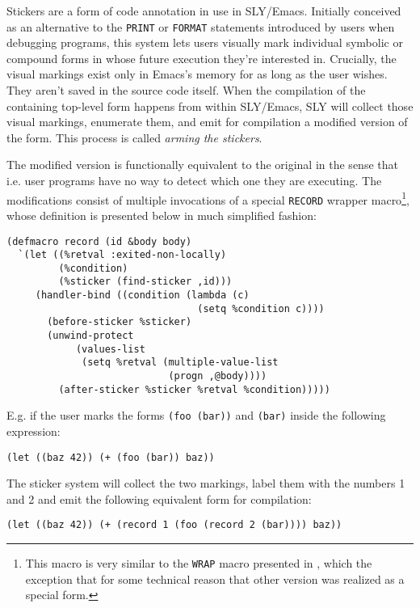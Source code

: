 \documentclass[sigconf]{acmart}
\begin{document}
Stickers are a form of code annotation in use in SLY/Emacs.  Initially
conceived as an alternative to the \texttt{PRINT} or \texttt{FORMAT}
statements introduced by users when debugging programs, this system
lets users visually mark individual symbolic or compound forms in
whose future execution they're interested in.  Crucially, the visual
markings exist only in Emacs's memory for as long as the user
wishes. They aren't saved in the source code itself.  When the
compilation of the containing top-level form happens from within
SLY/Emacs, SLY will collect those visual markings, enumerate them, and
emit for compilation a modified version of the form.  This process is
called \emph{arming the stickers}.

The modified version is functionally equivalent to the original in the
sense that i.e. user programs have no way to detect which one they are
executing.  The modifications consist of multiple invocations of a
special \texttt{RECORD} wrapper macro\footnote{This macro is very
  similar to the \texttt{WRAP} macro presented in
  \cite{annotation-based}, which the exception that for some technical
  reason that other version was realized as a special form.}, whose
definition is presented below in much simplified fashion:

\begin{verbatim}
(defmacro record (id &body body)
  `(let ((%retval :exited-non-locally)
         (%condition)
         (%sticker (find-sticker ,id)))
     (handler-bind ((condition (lambda (c)
                                 (setq %condition c))))
       (before-sticker %sticker)
       (unwind-protect
            (values-list
             (setq %retval (multiple-value-list
                            (progn ,@body))))
         (after-sticker %sticker %retval %condition)))))
\end{verbatim}

E.g. if the user marks the forms \texttt{(foo (bar))} and
\texttt{(bar)} inside the following expression:

\begin{verbatim}
(let ((baz 42)) (+ (foo (bar)) baz))
\end{verbatim}

The sticker system will collect the two markings, label them with the
numbers 1 and 2 and emit the following equivalent form for
compilation:

\begin{verbatim}
(let ((baz 42)) (+ (record 1 (foo (record 2 (bar)))) baz))
\end{verbatim}
\end{document}
